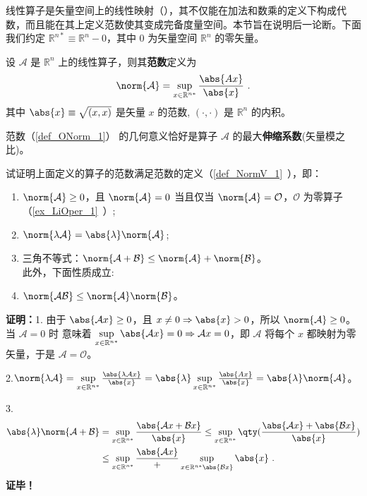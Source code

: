 线性算子是矢量空间上的线性映射（），其不仅能在加法和数乘的定义下构成代数，而且能在其上定义范数使其变成完备度量空间。本节旨在说明后一论断。下面我们约定 $\mathbb R^{n*}\equiv\mathbb R^n-0$，其中 $0$ 为矢量空间 $\mathbb R^n$ 的零矢量。
\begin{definition}{}\label{def_ONorm_1}
设 $\mathcal A$ 是 $\mathbb R^n$ 上的线性算子，则其\textbf{范数}定义为
\begin{equation}\label{eq_ONorm_1}
\norm{\mathcal A}=\sup_{x\in{\mathbb R^{n*}}}\frac{\abs{Ax}}{\abs{x}}~.
\end{equation}
其中 $\abs{x}\equiv\sqrt{(x,x)}$ 是矢量 $x$ 的范数, $(\cdot,\cdot)$ 是 $\mathbb R^n$ 的内积。
\end{definition}
范数（\autoref{def_ONorm_1}） 的几何意义恰好是算子 $\mathcal A$ 的最大\textbf{伸缩系数}(矢量模之比)。
\begin{example}{}
试证明上面定义的算子的范数满足范数的定义（\autoref{def_NormV_1}~），即：
\begin{enumerate}
\item $\norm{\mathcal A}\geq0$，且 $\norm{\mathcal A}=0$ 当且仅当 $\norm{\mathcal A}=\mathcal O$，$\mathcal O$ 为零算子（\autoref{ex_LiOper_1}~）;
\item $\norm{\lambda \mathcal A}=\abs{\lambda}\norm{\mathcal A}$;
\item 三角不等式：$\norm{\mathcal A+\mathcal B}\leq\norm{\mathcal A}+\norm{\mathcal B}$。\\
此外，下面性质成立:\\
\item $\norm{\mathcal{AB}}\leq{\norm{\mathcal A}}\norm{\mathcal B}$。
\end{enumerate}
\end{example}
\textbf{证明：}1. 由于 $\abs{\mathcal A x}\geq0$，且 $x\neq0\Rightarrow\abs{x}>0$，所以
$\norm{\mathcal A}\geq0$。当 $\mathcal A=0$ 时 意味着 $\sup\limits_{x\in{\mathbb R^{n*}}}\abs{\mathcal A x}=0\Rightarrow\mathcal A x=0$，即 $\mathcal A$ 将每个 $x$ 都映射为零矢量，于是 $\mathcal A=\mathcal O$。

2.$\norm{\lambda\mathcal A}=\sup\limits_{x\in{\mathbb R^{n*}}}\frac{\abs{\lambda \mathcal Ax}}{\abs{x}}=\abs{\lambda}\sup\limits_{x\in{\mathbb R^{n*}}}\frac{\abs{Ax}}{\abs{x}}=\abs{\lambda}\norm{\mathcal A}
$。

3.\begin{equation}
\begin{aligned}
\abs{\lambda}\norm{\mathcal A+\mathcal B}&=\sup\limits_{x\in{\mathbb R^{n*}}}\frac{\abs{\mathcal Ax+\mathcal B x}}{\abs{x}}\leq\sup\limits_{x\in{\mathbb R^{n*}}}\qty(\frac{\abs{\mathcal Ax}+\abs{\mathcal B x}}{\abs{x}})\\
&\leq \sup\limits_{x\in{\mathbb R^{n*}}}\frac{\abs{ \mathcal Ax}}+\sup\limits_{x\in{\mathbb R^{n*}}\abs{\mathcal B x}}{\abs{x}}~.
\end{aligned}
\end{equation}
\textbf{证毕！}
